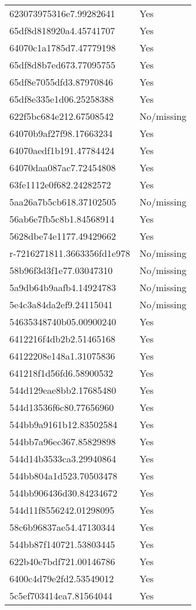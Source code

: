\begin{tabular}{ll}
623073975316e7.99282641 & Yes \\
65df8d818920a4.45741707 & Yes \\
64070c1a1785d7.47779198 & Yes \\
65df8d8b7ed673.77095755 & Yes \\
65df8e7055dfd3.87970846 & Yes \\
65df8e335e1d06.25258388 & Yes \\
622f5bc684e212.67508542 & No/missing \\
64070b9af27f98.17663234 & Yes \\
64070aedf1b191.47784424 & Yes \\
64070daa087ac7.72454808 & Yes \\
63fe1112e0f682.24282572 & Yes \\
5aa26a7b5cb618.37102505 & No/missing \\
56ab6e7fb5c8b1.84568914 & Yes \\
5628dbe74e1177.49429662 & Yes \\
r-7216271811.3663356fd1e978 & No/missing \\
58b96f3d3f1e77.03047310 & No/missing \\
5a9db64b9aafb4.14924783 & No/missing \\
5e4c3a84da2ef9.24115041 & No/missing \\
54635348740b05.00900240 & Yes \\
6412216f4db2b2.51465168 & Yes \\
64122208e148a1.31075836 & Yes \\
641218f1d56fd6.58900532 & Yes \\
544d129eae8bb2.17685480 & Yes \\
544d13536f6c80.77656960 & Yes \\
544bb9a9161b12.83502584 & Yes \\
544bb7a96ec367.85829898 & Yes \\
544d14b3533ca3.29940864 & Yes \\
544bb804a1d523.70503478 & Yes \\
544bb906436d30.84234672 & Yes \\
544d11f8556242.01298095 & Yes \\
58c6b96837ae54.47130344 & Yes \\
544bb87f140721.53803445 & Yes \\
622b40e7bdf721.00146786 & Yes \\
6400c4d79e2fd2.53549012 & Yes \\
5c5ef703414ea7.81564044 & Yes \\

\end{tabular}
